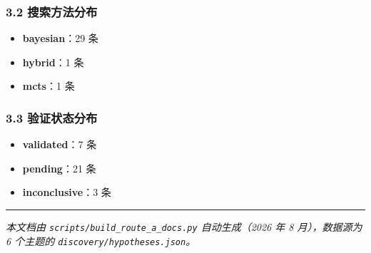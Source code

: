 \documentclass[12pt,a4paper]{ctexart}
\providecommand{\tightlist}{%
  \setlength{\itemsep}{0pt}\setlength{\parskip}{0pt}}
\begin{document}
\subsubsection{3.2 搜索方法分布}\label{ux641cux7d22ux65b9ux6cd5ux5206ux5e03}

\begin{itemize}
\tightlist
\item
  \textbf{bayesian}：29 条
\item
  \textbf{hybrid}：1 条
\item
  \textbf{mcts}：1 条
\end{itemize}

\subsubsection{3.3 验证状态分布}\label{ux9a8cux8bc1ux72b6ux6001ux5206ux5e03}

\begin{itemize}
\tightlist
\item
  \textbf{validated}：7 条
\item
  \textbf{pending}：21 条
\item
  \textbf{inconclusive}：3 条
\end{itemize}

\begin{center}\rule{0.5\linewidth}{0.5pt}\end{center}

\emph{本文档由 \texttt{scripts/build\_route\_a\_docs.py} 自动生成（2026 年 8 月），数据源为 6 个主题的 \texttt{discovery/hypotheses.json}。}
\end{document}
